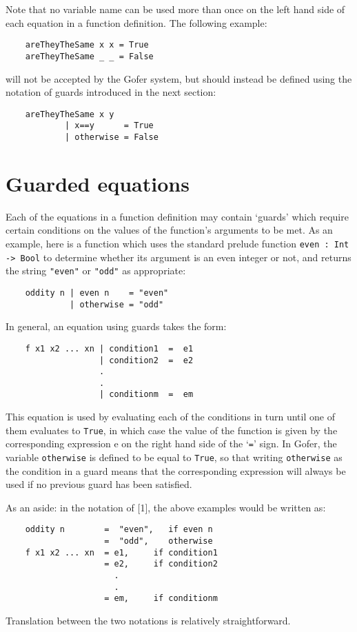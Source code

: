 Note that no variable name can be used more than once on the left  hand
side of each equation in a function definition.  The following example:
\begin{verbatim}
    areTheyTheSame x x = True 
    areTheyTheSame _ _ = False 
\end{verbatim}
will not be accepted by the Gofer system, but should instead be defined
using the notation of guards introduced in the next section:
\begin{verbatim}
    areTheyTheSame x y
            | x==y      = True
            | otherwise = False
\end{verbatim}

\section{Guarded equations}
Each of the equations in a function  definition  may  contain  `guards'
which require certain conditions  on  the  values  of  the  function's
arguments to be met.  As an example, here is a function which uses  the
standard prelude function \verb"even : Int -> Bool" to determine whether  its
argument is an even integer or not, and returns the  string  
\verb="even"=  or
\verb="odd"= as appropriate:
\begin{verbatim}
    oddity n | even n    = "even"
             | otherwise = "odd"
\end{verbatim}
In general, an equation using guards takes the form:
\begin{verbatim}
    f x1 x2 ... xn | condition1  =  e1
                   | condition2  =  e2
                   .
                   . 
                   | conditionm  =  em
\end{verbatim}
This equation is used by evaluating each  of  the  conditions  in  turn
until one of them evaluates to \verb"True", in which case the value  of  the
function is given by the corresponding expression e on the  right  hand
side of the `\verb"="' sign.  In Gofer, the variable 
\verb"otherwise" is defined to
be equal to 
\verb"True", so that writing 
\verb"otherwise" as the condition  in  a
guard means that the corresponding expression will always be used if no
previous guard has been satisfied.

As an aside: in the notation of [1], the above examples would be written as:
\begin{verbatim}
    oddity n        =  "even",   if even n
                    =  "odd",    otherwise
    f x1 x2 ... xn  = e1,     if condition1
                    = e2,     if condition2
                      .
                      .
                    = em,     if conditionm
\end{verbatim}
Translation between the two notations is relatively straightforward.


